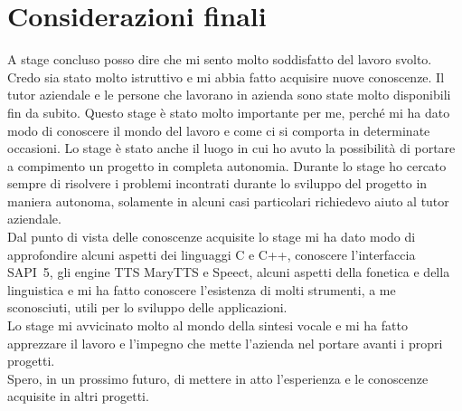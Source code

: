 \section{Considerazioni finali}
A stage concluso posso dire che mi sento molto soddisfatto del lavoro svolto. Credo sia stato molto istruttivo e mi abbia fatto acquisire nuove conoscenze.
Il tutor aziendale e le persone che lavorano in azienda sono state molto disponibili fin da subito.
Questo stage è stato molto importante per me, perché mi ha dato modo di conoscere il mondo del lavoro e come ci si comporta in determinate occasioni.
Lo stage è stato anche il luogo in cui ho avuto la possibilità di portare a compimento un progetto in completa autonomia.
Durante lo stage ho cercato sempre di risolvere i problemi incontrati durante lo sviluppo del progetto in maniera autonoma, solamente in alcuni casi particolari richiedevo aiuto al tutor aziendale.\\
Dal punto di vista delle conoscenze acquisite lo stage mi ha dato modo di approfondire alcuni aspetti dei linguaggi C e C++, conoscere l'interfaccia SAPI~5, gli engine TTS MaryTTS e Speect, alcuni aspetti della fonetica e della linguistica e mi ha fatto conoscere l'esistenza di molti strumenti, a me sconosciuti, utili per lo sviluppo delle applicazioni.\\
Lo stage mi avvicinato molto al mondo della sintesi vocale e mi ha fatto apprezzare il lavoro e l'impegno che mette l'azienda nel portare avanti i propri progetti.\\
Spero, in un prossimo futuro, di mettere in atto l'esperienza e le conoscenze acquisite in altri progetti. 
 